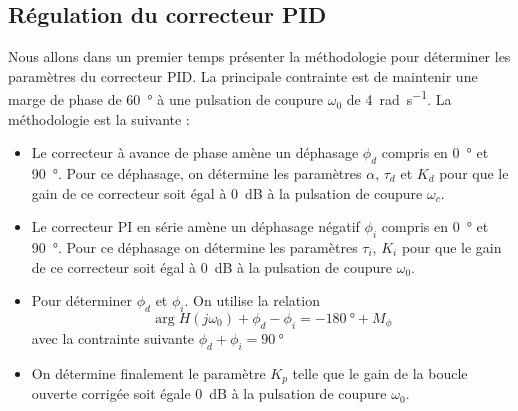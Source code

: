 \subsection*{Régulation du correcteur PID}
Nous allons dans un premier temps présenter la méthodologie pour déterminer les 
paramètres du correcteur PID. La principale contrainte est de maintenir une 
marge de phase de \SI{60}{\degree} à une pulsation de coupure $\omega_0$ de 
\SI{4}{\radian\per\second}.
La méthodologie est la suivante :
\begin{itemize}
    \item Le correcteur à avance de phase amène un déphasage $\phi_d$ compris 
          en \SI{0}{\degree} et \SI{90}{\degree}. 
          Pour ce déphasage, on détermine les paramètres $\alpha$, $\tau_d$ et 
          $K_d$ pour que le gain de ce correcteur soit égal à \SI{0}{\dB} 
          à la pulsation de coupure $\omega_c$.
    \item Le correcteur PI en série amène un déphasage négatif $\phi_i$ compris 
          en \SI{0}{\degree} et \SI{90}{\degree}.
          Pour ce déphasage on détermine les paramètres $\tau_i$, $K_i$ pour 
          que le gain de ce correcteur soit égal à \SI{0}{\dB} à la 
          pulsation de coupure $\omega_0$.
    \item Pour déterminer $\phi_d$ et $\phi_i$. On utilise la relation 
        \[
            \arg{H(j\omega_0)} + \phi_d - \phi_i = -\SI{180}{\degree} + M_\phi
        \]
          avec la contrainte suivante $\phi_d + \phi_i = \SI{90}{\degree}$
    \item On détermine finalement le paramètre $K_p$ telle que le gain de la 
          boucle ouverte corrigée soit égale \SI{0}{\dB} 
          à la pulsation de coupure $\omega_0$.
\end{itemize}
